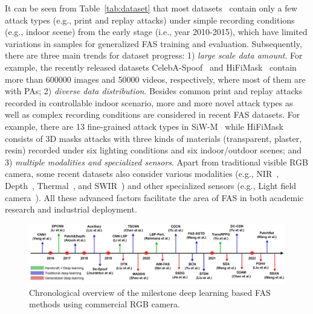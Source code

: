 \documentclass[10pt,journal,compsoc]{IEEEtran}
\begin{document}
It can be seen from Table~\ref{tab:dataset} that most datasets~\cite{tan2010face,peixoto2011face,Zhang2012A,ReplayAttack,kose2013shape,wen2015face,pinto2015using} contain only a few attack types (e.g., print and replay attacks) under simple recording conditions (e.g., indoor scene) from the early stage (i.e., year 2010-2015), which have limited variations in samples for generalized FAS training and evaluation. Subsequently, there are three main trends for dataset progress: 1) \textit{large scale data amount}. For example, the recently released datasets CelebA-Spoof~\cite{zhang2020celeba} and HiFiMask~\cite{liu2021contrastive} contain more than 600000 images and 50000 videos, respectively, where most of them are with PAs; 2) \textit{diverse data distribution}. Besides common print and replay attacks recorded in controllable indoor scenario, more and more novel attack types as well as complex recording conditions are considered in recent FAS datasets. For example, there are 13 fine-grained attack types in SiW-M~\cite{liu2019deep} while HiFiMask~\cite{liu2021contrastive} consists of 3D masks attacks with three kinds of materials (transparent, plaster, resin) recorded under six lighting conditions and six indoor/outdoor scenes; and 3) \textit{multiple modalities and specialized sensors}. Apart from traditional visible RGB camera, some recent datasets also consider various modalities (e.g., NIR~\cite{heusch2020deep,li2020casia,casiasurf,george2019biometric}, Depth~\cite{heusch2020deep,li2020casia,casiasurf,george2019biometric}, Thermal~\cite{heusch2020deep,george2019biometric}, and SWIR~\cite{heusch2020deep}) and other specialized sensors (e.g., Light field camera~\cite{raghavendra2015presentation,liu2019light}). All these advanced factors facilitate the area of FAS in both academic research and industrial deployment.   




\begin{figure}
\centering
\includegraphics[scale=0.44]{Figures/milestone.png}
\vspace{-1.0em}
  \caption{ 
  Chronological overview of the milestone deep learning based FAS methods using commercial RGB camera.}
  
\label{fig:milestone}
\vspace{-1.0em}
\end{figure}
\end{document}

